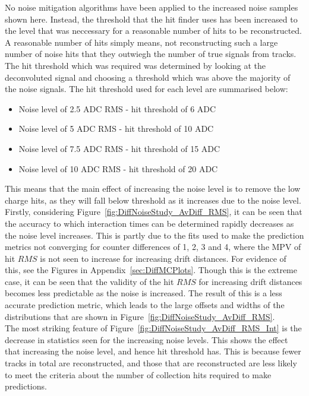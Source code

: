 No noise mitigation algorithms have been applied to the increased noise samples shown here. Instead, the threshold that the hit finder uses has been increased to the level that was neccessary for a reasonable number of hits to be reconstructed. A reasonable number of hits simply means, not reconstructing such a large number of noise hits that they outwiegh the number of true signals from tracks. The hit threshold which was required was determined by looking at the deconvoluted signal and choosing a threshold which was above the majority of the noise signals. The hit threshold used for each level are summarised below:
\begin{itemize}
\item Noise level of 2.5 ADC RMS - hit threshold of 6 ADC
\item Noise level of 5 ADC RMS - hit threshold of 10 ADC
\item Noise level of 7.5 ADC RMS - hit threshold of 15 ADC
\item Noise level of 10 ADC RMS - hit threshold of 20 ADC
\end{itemize}
This means that the main effect of increasing the noise level is to remove the low charge hits, as they will fall below threshold as it increases due to the noise level. \\

Firstly, considering Figure~\ref{fig:DiffNoiseStudy_AvDiff_RMS}, it can be seen that the accuracy to which interaction times can be determined rapidly decreases as the noise level increases. This is partly due to the fits used to make the prediction metrics not converging for counter differences of 1, 2, 3 and 4, where the MPV of hit $RMS$ is not seen to increase for increasing drift distances. For evidence of this, see the Figures in Appendix~\ref{sec:DiffMCPlots}. Though this is the extreme case, it can be seen that the validity of the hit $RMS$ for increasing drift distances becomes less predictable as the noise is increased. The result of this is a less accurate prediction metric, which leads to the large offsets and widths of the distributions that are shown in Figure~\ref{fig:DiffNoiseStudy_AvDiff_RMS}.\\

The most striking feature of Figure~\ref{fig:DiffNoiseStudy_AvDiff_RMS_Int} is the decrease in statistics seen for the increasing noise levels. This shows the effect that increasing the noise level, and hence hit threshold has. This is because fewer tracks in total are reconstructed, and those that are reconstructed are less likely to meet the criteria about the number of collection hits required to make predictions. \\

